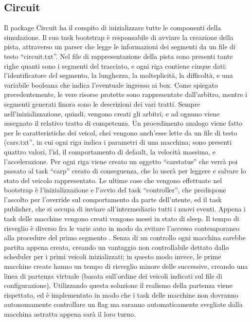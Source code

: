 \subsection{Circuit}

Il package Circuit ha il compito di inizializzare tutte le componenti della simulazione. 
Il suo task bootstrap è responsabile di avviare la creazione della pista, attraverso un parser che legge le informazioni dei segmenti da un file di testo “circuit.txt”. Nel file di rappresentazione della pista sono presenti tante righe quanti sono i segmenti del tracciato, e ogni riga contiene cinque dati: l’identificatore del segmento, la lunghezza, la molteplicità, la difficoltà, e una variabile booleana che indica l’eventuale ingresso ai box.
Come spiegato precedentemente, le vere risorse protette sono rappresentate dall’arbitro, mentre i segmenti generati finora sono le descrizioni dei vari tratti. Sempre nell’inizializzazione, quindi, vengono creati gli arbitri, e ad ognuno viene assegnato il relativo tratto di competenza.
Un procedimento analogo viene fatto per le caratteristiche dei veicol, chei vengono anch’esse lette da un file di testo (cars.txt”, in cui ogni riga indica i parametri di una macchina; sono presenti quattro valori, l’id, il comportamento di default, la velocità massima, e l’accelerazione.
Per ogni riga viene creato un oggetto ``car\textunderscore status'' che verrà poi passato al task ``car\textunderscore p'' creato di conseguenza, che lo userà per leggere e salvare lo stato del veicolo rappresentato.
Le ultime cose che vengono effettuate nel bootstrap è l’inizializzazione e l’avvio del task “controller”, che predispone l’ascolto per l’override sul comportamento da parte dell’utente, ed il task publisher, che si occupa di inviare all’intermediario tutti i nuovi eventi.
Appena i task delle macchine vengono creati vengono messi in stato di sleep. Il tempo di risveglio è diverso fra le varie auto in modo da evitare l'accesso contemporaneo alla procedure del primo segmento . Senza di un controllo ogni macchina sarebbe partita appena creata, creando un vantaggio non controllabile dettato dallo scheduler per i primi veicoli inizializzati; in questo modo invece, le prime macchine create hanno un tempo di risveglio minore delle successive, creando una linea di partenza virtuale (basata sull’ordine dei veicoli indicati sul file di configurazione). Utilizzando questa soluzione il realismo della partenza viene rispettato, ed è implementato in modo che i task delle macchine non dovranno autonomamente controllare un flag ma saranno automaticamente svegliate dalla macchina astratta appena sarà il loro turno.
